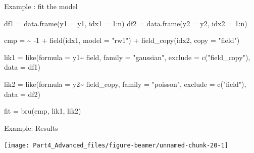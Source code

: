 \documentclass[
  ignorenonframetext,
]{beamer}
\newenvironment{Shaded}{\begin{snugshade}}{\end{snugshade}}
\newcommand{\AttributeTok}[1]{\textcolor[rgb]{0.77,0.63,0.00}{#1}}
\newcommand{\DecValTok}[1]{\textcolor[rgb]{0.00,0.00,0.81}{#1}}
\newcommand{\ErrorTok}[1]{\textcolor[rgb]{0.64,0.00,0.00}{\textbf{#1}}}
\newcommand{\FunctionTok}[1]{\textcolor[rgb]{0.00,0.00,0.00}{#1}}
\newcommand{\NormalTok}[1]{#1}
\newcommand{\OtherTok}[1]{\textcolor[rgb]{0.56,0.35,0.01}{#1}}
\newcommand{\SpecialCharTok}[1]{\textcolor[rgb]{0.00,0.00,0.00}{#1}}
\newcommand{\StringTok}[1]{\textcolor[rgb]{0.31,0.60,0.02}{#1}}
\begin{document}
\begin{frame}[fragile]{Example : fit the model}
\protect\hypertarget{example-fit-the-model-2}{}
\footnotesize

\begin{Shaded}
\begin{Highlighting}[]
\NormalTok{df1 }\OtherTok{=} \FunctionTok{data.frame}\NormalTok{(}\AttributeTok{y1 =}\NormalTok{ y1, }\AttributeTok{idx1 =}  \DecValTok{1}\SpecialCharTok{:}\NormalTok{n)}
\NormalTok{df2 }\OtherTok{=} \FunctionTok{data.frame}\NormalTok{(}\AttributeTok{y2 =}\NormalTok{ y2, }\AttributeTok{idx2 =}  \DecValTok{1}\SpecialCharTok{:}\NormalTok{n)}

\NormalTok{cmp }\OtherTok{=} \ErrorTok{\textasciitilde{}} \SpecialCharTok{{-}}\DecValTok{1} \SpecialCharTok{+} 
  \FunctionTok{field}\NormalTok{(idx1, }\AttributeTok{model =} \StringTok{"rw1"}\NormalTok{) }\SpecialCharTok{+} 
  \FunctionTok{field\_copy}\NormalTok{(idx2, }\AttributeTok{copy =} \StringTok{"field"}\NormalTok{)}

\NormalTok{lik1 }\OtherTok{=} \FunctionTok{like}\NormalTok{(}\AttributeTok{formula  =}\NormalTok{ y1}\SpecialCharTok{\textasciitilde{}}\NormalTok{ field,}
            \AttributeTok{family =} \StringTok{"gaussian"}\NormalTok{,}
            \AttributeTok{exclude =} \FunctionTok{c}\NormalTok{(}\StringTok{"field\_copy"}\NormalTok{),}
            \AttributeTok{data =}\NormalTok{ df1)}

\NormalTok{lik2 }\OtherTok{=} \FunctionTok{like}\NormalTok{(}\AttributeTok{formula  =}\NormalTok{ y2}\SpecialCharTok{\textasciitilde{}}\NormalTok{ field\_copy,}
            \AttributeTok{family =} \StringTok{"poisson"}\NormalTok{,}
            \AttributeTok{exclude =} \FunctionTok{c}\NormalTok{(}\StringTok{"field"}\NormalTok{),}
            \AttributeTok{data =}\NormalTok{ df2)}

\NormalTok{fit }\OtherTok{=} \FunctionTok{bru}\NormalTok{(cmp, }
\NormalTok{          lik1,}
\NormalTok{          lik2)}
\end{Highlighting}
\end{Shaded}

\normalsize
\end{frame}

\begin{frame}{Example: Results}
\protect\hypertarget{example-results}{}
\begin{center}\texttt{[image: Part4\_Advanced\_files/figure-beamer/unnamed-chunk-20-1]} \end{center}
\end{frame}
\end{document}
